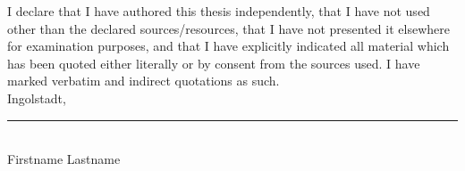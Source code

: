 
I declare that I have authored this thesis independently, that I have not used other than the declared sources/resources, that I have not presented it elsewhere for examination purposes, and that I have explicitly indicated all material which has been quoted either literally or by consent from the sources used. I have marked verbatim and indirect quotations as such.	\\[2em]
	
Ingolstadt, \rule{0.3\textwidth}{0.4pt}	\\ [1.5cm]
	
Firstname Lastname


